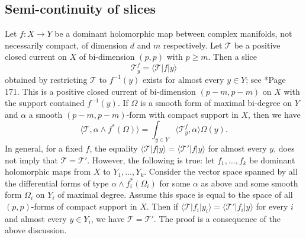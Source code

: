 \documentclass[11pt]{amsart}
\theoremstyle{definition}
\newtheorem{lemma}[theorem]{Lemma}
\newtheorem{example}[theorem]{Example}
\newcommand{\lto}{\longrightarrow}
\newcommand{\C}{\mathbb{C}}
\newcommand{\sT}{\mathscr{T}}
\begin{document}
\subsection{Semi-continuity of slices} Let $f:X\lto Y$ be a dominant holomorphic map between complex manifolds, not necessarily compact, of dimension $d$ and $m$ respectively. Let $\sT$ be a positive closed current on $X$ of bi-dimension $(p,p)$ with $p\geq m$. Then a slice
$$\sT^f_y=\langle \sT|f|y\rangle$$
obtained by restricting $\sT$ to $f^{-1}(y)$ exists for almost every $y\in Y$; see \cite{DemaillyBook1}*{Page 171}. This is a positive closed current of bi-dimension $(p-m,p-m)$ on $X$ with the support contained $f^{-1}(y)$. If $\Omega$ is a smooth form of maximal bi-degree on $Y$ and $\alpha$ a smooth $(p-m,p-m)$-form with compact support in $X$, then we have
$$
\langle \sT,\alpha\wedge f^*(\Omega)\rangle = \int_{y\in Y} \langle \sT^f_y,\alpha\rangle \Omega(y).
$$
In general, for a fixed $f$, the equality $\langle \sT|f|y\rangle = \langle \sT'|f|y\rangle$ for almost every $y$, does not imply that $\sT=\sT'$. However, the following is true: let $f_1,\ldots,f_k$ be dominant holomorphic maps from $X$ to $Y_1,\ldots, Y_k$. Consider the vector space spanned by all the differential forms of type $\alpha\wedge f_i^*(\Omega_i)$ for some $\alpha$ as above and some smooth form $\Omega_i$ on $Y_i$ of maximal degree. Assume this space is equal to the space of all $(p,p)$-forms of compact support in $X$. Then if $\langle \sT|f_i|y_i\rangle = \langle \sT'|f_i|y\rangle$ for every $i$ and almost every $y\in Y_i$, we have $\sT=\sT'$. The proof is a consequence of the above discussion. 
\end{document}
